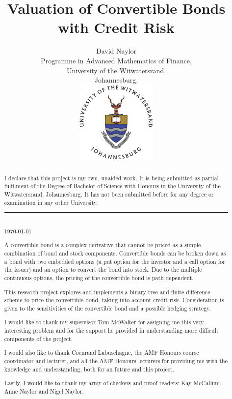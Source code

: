\documentclass[a4paper,11pt,oneside]{report}
\title{Valuation of Convertible Bonds with Credit Risk}
\author{David Naylor\\[2cm]
Programme in Advanced Mathematics of Finance,\\
University of the Witwatersrand,\\
Johannesburg.\\[2cm]
\includegraphics[width=4cm]{../common/WitsColourLogo}\\[2cm]
}
\newcommand{\setlinespacing}[1]
           {\renewcommand{\baselinestretch}{#1}\small\normalsize}
\theoremstyle{plain}
\theoremstyle{definition}
\begin{document}
\maketitle \setlinespacing{1.20}


\def\abstractname{\Huge Declaration}
\begin{abstract}
I declare that this project is my own, unaided work. It is being submitted as partial fulfilment of the Degree of Bachelor of Science with Honours in the University of the Witwatersrand, Johannesburg. It has not been submitted before for any degree or examination in any other University.\\[3cm]
\noindent\rule{5cm}{0.5pt}\\[1cm]
\noindent \today
\end{abstract}


\def\abstractname{\Huge Abstract}
\begin{abstract}
A convertible bond is a complex derivative that cannot be priced as a simple combination of bond and stock components.  Convertible bonds can be broken down as a bond with two embedded options (a put option for the investor and a call option for the issuer) and an option to convert the bond into stock.  Due to the multiple continuous options, the pricing of the convertible bond is path dependent.

This research project explores and implements a binary tree and finite difference scheme to price the convertible bond, taking into account credit risk.  Consideration is given to the sensitivities of the convertible bond and a possible hedging strategy.
\end{abstract}


\def\abstractname{\Huge Acknowledgements}
\begin{abstract}
I would like to thank my supervisor Tom McWalter for assigning me this very interesting problem and for the support he provided in understanding more difficult components of the project.

I would also like to thank Coenraad Labuschagne, the AMF Honours course coordinator and lecturer, and all the AMF Honours lecturers for providing me with the knowledge and understanding, both for an future and this project.

Lastly, I would like to thank my army of checkers and proof readers: Kay \mbox{McCallum}, Anne Naylor and Nigel Naylor.
\end{abstract}
\end{document}
